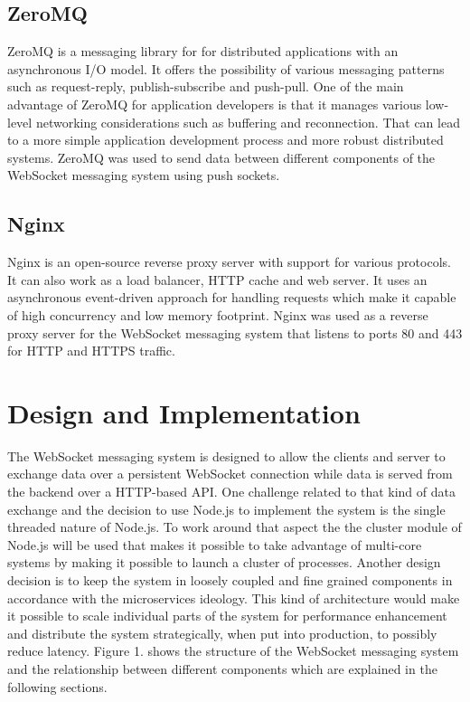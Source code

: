 \subsection{ZeroMQ}

ZeroMQ is a messaging library for for distributed applications with an asynchronous I/O model. It offers the possibility of various messaging patterns such as request-reply, publish-subscribe and push-pull. One of the main advantage of ZeroMQ for application developers is that it manages various low-level networking considerations such as buffering and reconnection. That can lead to a more simple application development process and more robust distributed systems. ZeroMQ was used to send data between different components of the WebSocket messaging system using push sockets.

\subsection{Nginx}

Nginx is an open-source reverse proxy server with support for various protocols. It can also work as a load balancer, HTTP cache and web server. It uses an asynchronous event-driven approach for handling requests which make it capable of high concurrency and low memory footprint. Nginx was used as a reverse proxy server for the WebSocket messaging system that listens to ports 80 and 443 for HTTP and HTTPS traffic.

\section{Design and Implementation}

The WebSocket messaging system is designed to allow the clients and server to exchange data over a persistent WebSocket connection while data is served from the backend over a HTTP-based API. One challenge related to that kind of data exchange and the decision to use Node.js to implement the system is the single threaded nature of Node.js. To work around that aspect the the cluster module of Node.js will be used that makes it possible to take advantage of multi-core systems by making it possible to launch a cluster of processes. Another design decision is to keep the system in loosely coupled and fine grained components in accordance with the microservices ideology. This kind of architecture would make it possible to scale individual parts of the system for performance enhancement and distribute the system strategically, when put into production, to possibly reduce latency. Figure 1. shows the structure of the WebSocket messaging system and the relationship between different components which are explained in the following sections.

